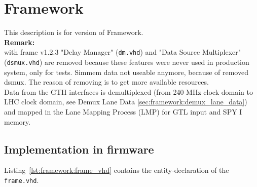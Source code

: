 \section{Framework}\label{sec:framework:framework}

This description is for version \versionframe of Framework.\\

\textbf{Remark:}\\
with frame v1.2.3 "Delay Manager" (\texttt{dm.vhd}) and "Data Source Multiplexer" (\texttt{dsmux.vhd}) are removed because these features were never used in production system, only for tests.
Simmem data not useable anymore, because of removed dsmux.
The reason of removing is to get more available resources.\\

%


Data from the GTH interfaces is demultiplexed (from 240 MHz clock domain to LHC clock domain, see Demux Lane Data \ref{sec:framework:demux_lane_data}) and mapped in the Lane Mapping Process (LMP) for GTL input and SPY I memory.

\subsection{Implementation in firmware}
\label{sec:framework:implementation_firmware}

Listing~\ref{lst:framework:frame_vhd} contains the entity-declaration of the \texttt{frame.vhd}.\\



